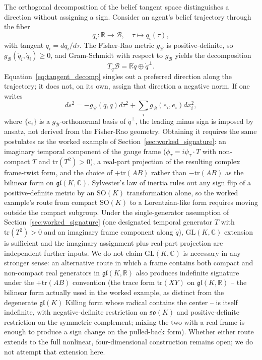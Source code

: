 \documentclass[11pt]{article}
\begin{document}
The orthogonal decomposition of the belief tangent space distinguishes a direction without assigning a sign. Consider an agent's belief trajectory through the fiber
\begin{equation}
q_i: \mathbb{R} \to \mathcal{B}, \quad \tau \mapsto q_i(\tau),
\end{equation}
with tangent $\dot{q}_i = dq_i/d\tau$. The Fisher-Rao metric $g_{\mathcal{B}}$ is positive-definite, so $g_{\mathcal{B}}(\dot{q}_i, \dot{q}_i) \geq 0$, and Gram-Schmidt with respect to $g_{\mathcal{B}}$ yields the decomposition
\begin{equation}
T_q\mathcal{B} = \mathbb{R}\dot{q} \oplus \dot{q}^\perp.
\label{eq:tangent_decomp}
\end{equation}
Equation~\eqref{eq:tangent_decomp} singles out a preferred direction along the trajectory; it does not, on its own, assign that direction a negative norm. If one writes
\begin{equation}
ds^2 = -g_{\mathcal{B}}(\dot{q}, \dot{q}) d\tau^2 + \sum_i g_{\mathcal{B}}(e_i, e_i) dx_i^2,
\label{eq:lor_belief_metric}
\end{equation}
where $\{e_i\}$ is a $g_{\mathcal{B}}$-orthonormal basis of $\dot{q}^\perp$, the leading minus sign is imposed by ansatz, not derived from the Fisher-Rao geometry. Obtaining it requires the same postulates as the worked example of Section~\ref{sec:worked_signature}: an imaginary temporal component of the gauge frame ($\phi_\tau = i\psi_\tau \cdot T$ with non-compact $T$ and $\mathrm{tr}(T^2) > 0$), a real-part projection of the resulting complex frame-twist form, and the choice of $+\mathrm{tr}(AB)$ rather than $-\mathrm{tr}(AB)$ as the bilinear form on $\mathfrak{gl}(K, \mathbb{C})$. Sylvester's law of inertia rules out any sign flip of a positive-definite metric by an $\mathrm{SO}(K)$ transformation alone, so the worked example's route from compact $\mathrm{SO}(K)$ to a Lorentzian-like form requires moving outside the compact subgroup. Under the single-generator assumption of Section~\ref{sec:worked_signature} (one designated temporal generator $T$ with $\mathrm{tr}(T^2) > 0$ and an imaginary frame component along $\dot{q}$), $\mathrm{GL}(K, \mathbb{C})$ extension is sufficient and the imaginary assignment plus real-part projection are independent further inputs. We do not claim $\mathrm{GL}(K, \mathbb{C})$ is necessary in any stronger sense: an alternative route in which a frame contains both compact and non-compact real generators in $\mathfrak{gl}(K, \mathbb{R})$ also produces indefinite signature under the $+\mathrm{tr}(AB)$ convention (the trace form $\mathrm{tr}(XY)$ on $\mathfrak{gl}(K, \mathbb{R})$ -- the bilinear form actually used in the worked example, as distinct from the degenerate $\mathfrak{gl}(K)$ Killing form whose radical contains the center -- is itself indefinite, with negative-definite restriction on $\mathfrak{so}(K)$ and positive-definite restriction on the symmetric complement; mixing the two with a real frame is enough to produce a sign change on the pulled-back form). Whether either route extends to the full nonlinear, four-dimensional construction remains open; we do not attempt that extension here.
\end{document}
